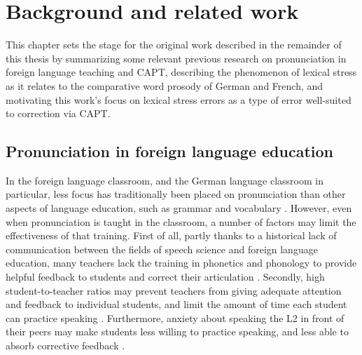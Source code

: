 %
%
\chapter{Background and related work}
\label{chap:background}



This chapter sets the stage for the original work described in the remainder of this thesis by summarizing some relevant previous research on pronunciation in foreign language teaching and CAPT, describing the phenomenon of lexical stress as it relates to the comparative word prosody of German and French, and motivating this work's focus on lexical stress errors as a type of error well-suited to correction via CAPT.


	\section{Pronunciation in foreign language education}
	\label{sec:bkgd:l2ed}
%	


In the foreign language classroom, and the German language classroom in particular, less focus has traditionally been placed on pronunciation than other aspects of language education, such as grammar and vocabulary %
\citep{Hirschfeld2007}.
However, even when pronunciation is taught in the classroom, a number of factors may limit the effectiveness of that training. %
First of all, partly thanks to a historical lack of communication between the fields of speech science and foreign language education, many teachers lack the training in phonetics and phonology to provide helpful feedback to students and correct their articulation \citep{Derwing2005,Hirschfeld2007}. Secondly, high student-to-teacher ratios may prevent teachers from giving adequate attention and feedback to individual students, and limit the amount of time each student can practice speaking \citep{Neri2002}. Furthermore, anxiety about speaking the L2 in front of their peers may make students less willing to practice speaking, and less able to absorb corrective feedback \citep{Neri2002}. 



